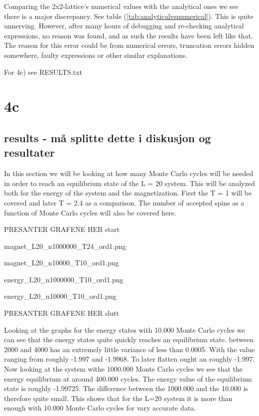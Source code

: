 \documentclass{article}
\begin{document}
Comparing the 2x2-lattice's numerical values with the analytical ones we see there is a major discrepancy. See table (\ref{tab:analyticalvsnumerical}). This is quite unnerving. However, after many hours of debugging and re-checking analytical expressions, no reason was found, and as such the results have been left like that. The reason for this error could be from numerical errors, truncation errors hidden somewhere, faulty expressions or other similar explanations.

For 4c) see RESULTS.txt



\section{4c}
\subsection{results - må splitte dette i diskusjon og resultater}
In this section we will be looking at how many Monte Carlo cycles will be needed in order to reach an equilibrium state of the L = 20 system. This will be analyzed both for the energy of the system and the magnetization. First the T = 1 will be covered and later T = 2.4 as a comparison. The number of accepted spins as a function of Monte Carlo cycles will also be covered here.

PRESANTER GRAFENE HER start


magnet\_L20\_n1000000\_T24\_ord1.png

magnet\_L20\_n10000\_T10\_ord1.png

energy\_L20\_n1000000\_T10\_ord1.png

energy\_L20\_n10000\_T10\_ord1.png

PRESANTER GRAFENE HER slutt

Looking at the graphs for the energy states with 10.000 Monte Carlo cycles we can see that the energy states quite quickly reaches an equilibrium state. between 2000 and 4000 has an extremely little variance of less than 0.0005. With the value ranging from roughly -1.997 and -1.9968. To later flatten ought an roughly -1.997. Now looking at the system withe 1000.000 Monte Carlo cycles we see that the energy equilibrium at around 400.000 cycles. The energy value of the equilibrium state is roughly -1.99725. The difference between the 1000.000 and the 10.000 is therefore quite small. This shows that for the L=20 system it is more than enough with 10.000 Monte Carlo cycles for vary accurate data.
\end{document}
